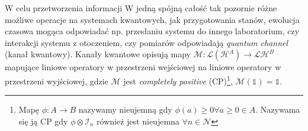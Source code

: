 \documentclass[10pt]{article} %
\newcommand{\Hx}[1]{\mathcal{H}^{#1}}
\begin{document}
W celu przetworzenia informacji W jedną spójną całość tak pozornie różne możliwe operacje na systemach kwantowych, jak przygotowania stanów, ewolucja czasowa mogąca odpowiadać np. przesłaniu systemu do innego laboratorium, czy interakcji systemu z otoczeniem, czy pomiarów odpowiadają \textit{quantum channel} (kanał kwantowy). Kanały kwantowe opisują mapy $\mathcal{M}: \mathcal{L}(\Hx{A}) \to \mathcal{L}{\Hx{B}}$ mapujące liniowe operatory w przestrzeni wejściowej na liniowe operatory w przestrzeni wyjściowej, gdzie $\mathcal{M}$ jest \textit{completely positive} (CP)\footnote
{
Mapę $\phi: A \to B$ nazywamy nieujemną gdy $\phi(a) \geq 0 \forall a\geq 0 \in A$. Nazywama się ją CP gdy $\phi \otimes \mathcal{I}_n$ również jest nieujemna $\forall n \in \mathcal{N}$
}, $\mathcal{M}(\mathbb{1}) = \mathbb{1}$.

\end{document}
